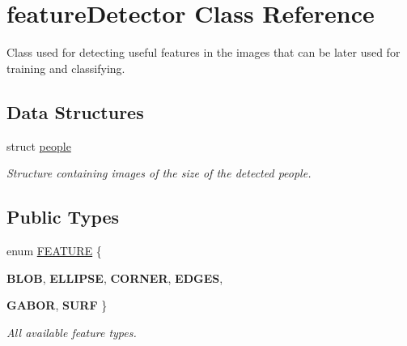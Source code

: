 \hypertarget{classfeatureDetector}{
\section{featureDetector Class Reference}
\label{classfeatureDetector}
}


Class used for detecting useful features in the images that can be later used for training and classifying.  


\subsection*{Data Structures}
\begin{DoxyCompactItemize}
\item 
struct \hyperlink{structfeatureDetector_1_1people}{people}
\begin{DoxyCompactList}\small\item\em Structure containing images of the size of the detected people. \item\end{DoxyCompactList}\end{DoxyCompactItemize}
\subsection*{Public Types}
\begin{DoxyCompactItemize}
\item 
enum \hyperlink{classfeatureDetector_a84a8847c4124b284d1d5ae20bc9be583}{FEATURE} \{ \par
{\bfseries BLOB}, 
{\bfseries ELLIPSE}, 
{\bfseries CORNER}, 
{\bfseries EDGES}, 
\par
{\bfseries GABOR}, 
{\bfseries SURF}
 \}
\begin{DoxyCompactList}\small\item\em All available feature types. \item\end{DoxyCompactList}\end{DoxyCompactItemize}
